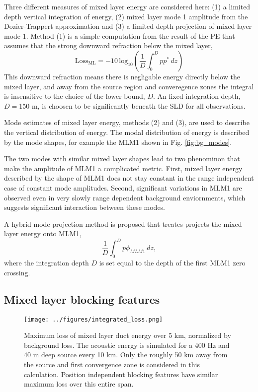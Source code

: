 \documentclass[preprint,NumberedRefs]{JASA}
\begin{document}
Three different measures of mixed layer energy are considered here: (1) a limited depth vertical integration of energy, (2) mixed layer mode 1 amplitude from the Dozier-Trappert approximation and (3) a limited depth projection of mixed layer mode 1. Method (1) is a simple computation from the result of the PE that assumes that the strong downward refraction below the mixed layer,
\begin{equation}
    \textrm{Loss}_{\textrm{ML}} = -10 \, \textrm{log}_{10} \left( \frac{1}{D} \int^{D}_0 p p^* \,  dz \right)
\end{equation}
This downward refraction means there is negligable energy directly below the mixed layer, and away from the source region and converegence zones the integral is insensitive to the choice of the lower bound, $D$. An fixed integration depth, $D=$150 m, is choosen to be significantly beneath the SLD for all observations.

Mode estimates of mixed layer energy, methods (2) and (3), are used to describe the vertical distribution of energy. The modal distribution of energy is described by the mode shapes, for example the MLM1 shown in Fig. \ref{fig:bg_modes}.

The two modes with similar mixed layer shapes lead to two phenominon that make the amplitude of MLM1 a complicated metric. First, mixed layer energy described by the shape of MLM1 does not stay constant in the range independent case of constant mode amplitudes. Second, significant variations in MLM1 are observed even in very slowly range dependent background enviornments, which suggests significant interaction between these modes.

A hybrid mode projection method is proposed that treates projects the mixed layer energy onto MLM1,
\begin{equation}
    \frac{1}{D} \int^{D}_0 p \phi_{MLM1} \,  dz,
\end{equation}
where the integration depth $D$ is set equal to the depth of the first MLM1 zero crossing.

\subsection{Mixed layer blocking features}
\begin{figure}
\texttt{[image: ../figures/integrated\_loss.png]}
    \caption{Maximum loss of mixed layer duct energy over 5 km, normalized by background loss. The acoustic energy is simulated for a 400 Hz and 40 m deep source every 10 km. Only the roughly 50 km away from the source and first convergence zone is considered in this calculation. Position independent blocking features have similar maximum loss over this entire span.}
    \label{fig:bg_eng}
\end{figure}
\end{document}
